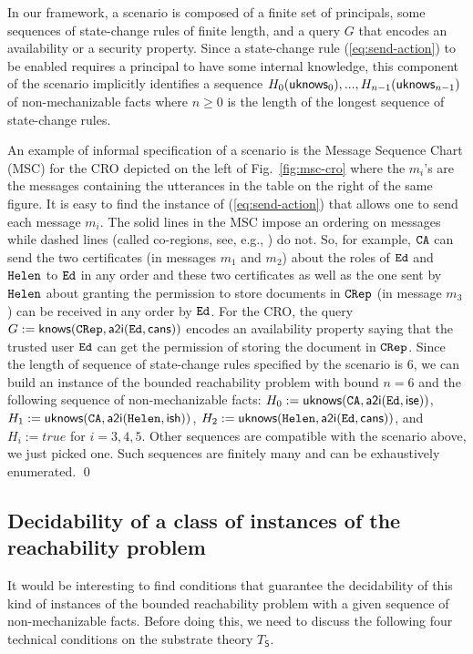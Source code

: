 \documentclass[conference]{llncs}
\newcommand{\theCA}{\ensuremath \mathtt{CA}}
\newcommand{\Ed}{\ensuremath \mathtt{Ed}}
\newcommand{\Helen}{\ensuremath \mathtt{Helen}}
\newcommand{\CRep}{\ensuremath \mathtt{CRep}}
\newcommand{\canstoredoc}{\ensuremath \mathsf{cans}}
\newcommand{\ishead}{\ensuremath \mathsf{ish}}
\newcommand{\isemployee}{\ensuremath \mathsf{ise}}
\newcommand{\know}{\ensuremath \mathsf{knows}}
\newcommand{\atoi}{\ensuremath \mathsf{a2i}}
\newcommand{\knowzero}{\ensuremath \mathsf{uknows}}
\newcommand{\CRO}{CRO}
\begin{document}
In our framework, a scenario is composed of a finite set of principals,
some sequences of state-change rules of finite length, and a query $G$
that encodes an availability or a security property. Since a
state-change rule (\ref{eq:send-action}) to be enabled requires a
principal to have some internal knowledge, this component of the
scenario implicitly identifies a sequence $H_0(\knowzero_0), ...,
H_{n-1}(\knowzero_{n-1})$ of non-mechanizable facts where $n\geq 0$ is
the length of the longest sequence of state-change rules. 

\begin{example}
An example of informal specification of a scenario is the Message Sequence Chart (MSC)
for the \CRO{} depicted on the left of Fig.~\ref{fig:msc-cro} where the
$m_i$'s are the messages containing the utterances in the table on the
right of the same figure. It is easy to find the instance of
(\ref{eq:send-action}) that allows one to send each message $m_i$. The
solid lines in the MSC impose an ordering on messages while dashed lines
(called co-regions, see, e.g., \cite{rudolph96}) do not. So, for
example, $\theCA$ can send the two certificates (in messages $m_1$ and
$m_2$) about the roles of $\Ed$ and $\Helen$ to $\Ed$ in any order and
these two certificates as well as the one sent by $\Helen$ about
granting the permission to store documents in $\CRep$ (in message $m_3$)
can be received in any order by $\Ed$. For the \CRO{}, the query
$G:=\know(\CRep, \atoi(\Ed, \canstoredoc))$ encodes an availability
property saying that the trusted user $\Ed$ can get the permission of
storing the document in $\CRep$. Since the length of sequence of
state-change rules specified by the scenario is $6$, we can build an
instance of the bounded reachability problem with bound $n=6$ and the
following sequence of non-mechanizable facts: $H_0:=\knowzero(\theCA,
\atoi(\Ed,\isemployee))$, $H_1:=\knowzero(\theCA,
\atoi(\Helen,\ishead))$, $H_2:=\knowzero(\Helen,
\atoi(\Ed,\canstoredoc))$, and $H_i:=\mathit{true}$ for $i=3,4,5$.
Other sequences are compatible with the scenario above, we just picked
one. Such sequences are finitely many and can be exhaustively enumerated.
\qed
\end{example}


\subsection{Decidability of a class of instances of the reachability problem}
 It would be interesting to find conditions that guarantee the
decidability of this kind of instances of the bounded reachability
problem with a given sequence of non-mechanizable facts. Before doing
this, we need to discuss the following four technical conditions on the
substrate theory $T_{\mathsf{S}}$.
\end{document}
